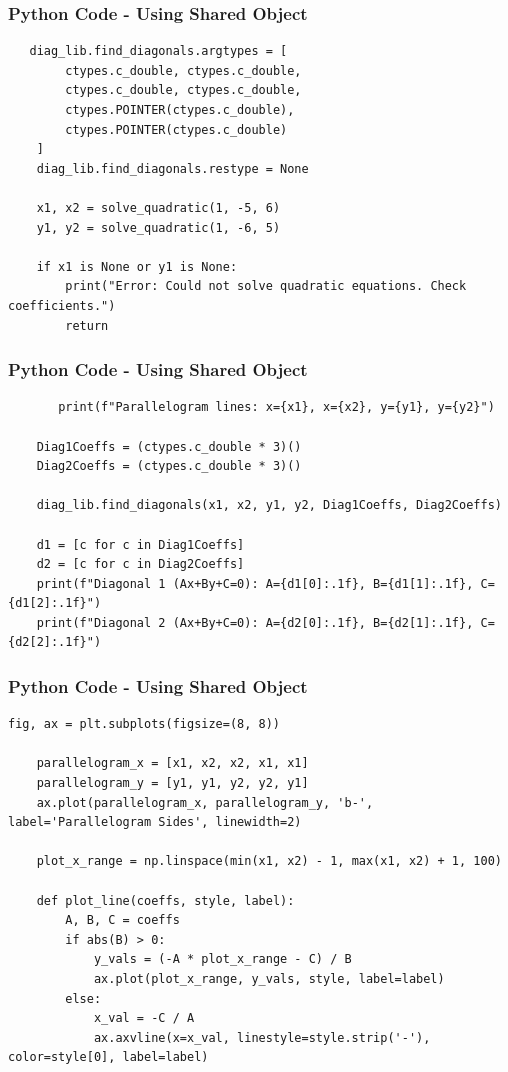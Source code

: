 \documentclass{beamer}
\begin{document}
\begin{frame}[fragile]
    \frametitle{Python Code - Using Shared Object}
    \begin{lstlisting}
   diag_lib.find_diagonals.argtypes = [
        ctypes.c_double, ctypes.c_double,
        ctypes.c_double, ctypes.c_double,
        ctypes.POINTER(ctypes.c_double),
        ctypes.POINTER(ctypes.c_double)
    ]
    diag_lib.find_diagonals.restype = None

    x1, x2 = solve_quadratic(1, -5, 6)
    y1, y2 = solve_quadratic(1, -6, 5)

    if x1 is None or y1 is None:
        print("Error: Could not solve quadratic equations. Check coefficients.")
        return
\end{lstlisting}
\end{frame}
\begin{frame}[fragile]
    \frametitle{Python Code - Using Shared Object}
    \begin{lstlisting}
       print(f"Parallelogram lines: x={x1}, x={x2}, y={y1}, y={y2}")

    Diag1Coeffs = (ctypes.c_double * 3)()
    Diag2Coeffs = (ctypes.c_double * 3)()

    diag_lib.find_diagonals(x1, x2, y1, y2, Diag1Coeffs, Diag2Coeffs)

    d1 = [c for c in Diag1Coeffs]
    d2 = [c for c in Diag2Coeffs]
    print(f"Diagonal 1 (Ax+By+C=0): A={d1[0]:.1f}, B={d1[1]:.1f}, C={d1[2]:.1f}")
    print(f"Diagonal 2 (Ax+By+C=0): A={d2[0]:.1f}, B={d2[1]:.1f}, C={d2[2]:.1f}")
\end{lstlisting}
\end{frame}
\begin{frame}[fragile]
    \frametitle{Python Code - Using Shared Object}
    \begin{lstlisting}
fig, ax = plt.subplots(figsize=(8, 8))

    parallelogram_x = [x1, x2, x2, x1, x1]
    parallelogram_y = [y1, y1, y2, y2, y1]
    ax.plot(parallelogram_x, parallelogram_y, 'b-', label='Parallelogram Sides', linewidth=2)

    plot_x_range = np.linspace(min(x1, x2) - 1, max(x1, x2) + 1, 100)
    
    def plot_line(coeffs, style, label):
        A, B, C = coeffs
        if abs(B) > 0:
            y_vals = (-A * plot_x_range - C) / B
            ax.plot(plot_x_range, y_vals, style, label=label)
        else:
            x_val = -C / A
            ax.axvline(x=x_val, linestyle=style.strip('-'), color=style[0], label=label)
\end{lstlisting}
\end{frame}
\end{document}
